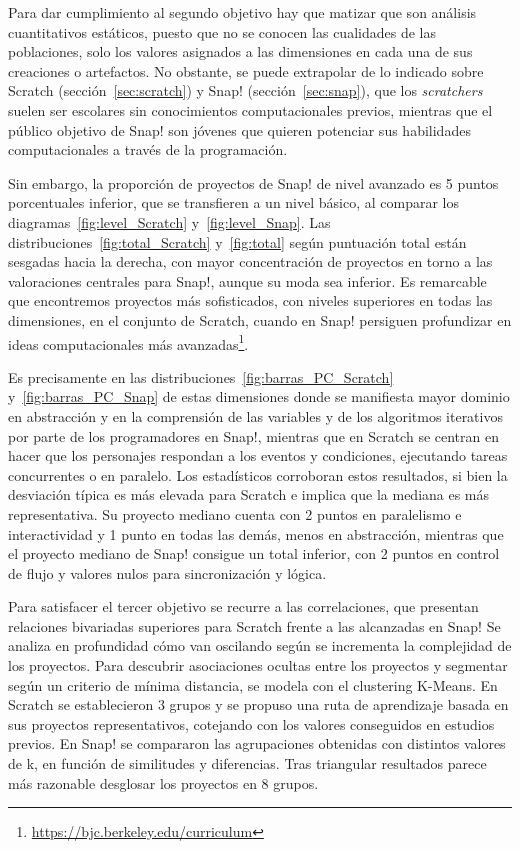 \documentclass[a4paper, 12pt]{book}
\begin{document}
Para dar cumplimiento al segundo objetivo hay que matizar que son análisis cuantitativos estáticos, puesto que no se conocen las cualidades de las poblaciones, solo los valores asignados a las dimensiones en cada una de sus creaciones o artefactos. No obstante, se puede extrapolar de lo indicado sobre Scratch (sección~\ref{sec:scratch}) y Snap! (sección~\ref{sec:snap}), que los \emph{scratchers} suelen ser escolares sin conocimientos computacionales previos, mientras que el público objetivo de Snap! son jóvenes que quieren potenciar sus habilidades computacionales a través de la programación.

Sin embargo, la proporción de proyectos de Snap! de nivel avanzado es 5 puntos porcentuales inferior, que se transfieren a un nivel básico, al comparar los diagramas~\ref{fig:level_Scratch} y~\ref{fig:level_Snap}. Las distribuciones~\ref{fig:total_Scratch} y~\ref{fig:total} según puntuación total están sesgadas hacia la derecha, con mayor concentración de proyectos en torno a las valoraciones centrales para Snap!, aunque su moda sea inferior. Es remarcable que encontremos proyectos más sofisticados, con niveles superiores en todas las dimensiones, en el conjunto de Scratch, cuando en Snap! persiguen profundizar en ideas computacionales más avanzadas\footnote{\url{https://bjc.berkeley.edu/curriculum}}.

Es precisamente en las distribuciones~\ref{fig:barras_PC_Scratch} y~\ref{fig:barras_PC_Snap} de estas dimensiones donde se manifiesta mayor dominio en abstracción y en la comprensión de las variables y de los algoritmos iterativos por parte de los programadores en Snap!, mientras que en Scratch se centran en hacer que los personajes respondan a los eventos y condiciones, ejecutando tareas concurrentes o en paralelo. Los estadísticos corroboran estos resultados, si bien la desviación típica es más elevada para Scratch e implica que la mediana es más representativa. Su proyecto mediano cuenta con 2 puntos en paralelismo e interactividad y 1 punto en todas las demás, menos en abstracción, mientras que el proyecto mediano de Snap! consigue un total inferior, con 2 puntos en control de flujo y valores nulos para sincronización y lógica.

Para satisfacer el tercer objetivo se recurre a las correlaciones, que presentan relaciones bivariadas superiores para Scratch frente a las alcanzadas en Snap! Se analiza en profundidad cómo van oscilando según se incrementa la complejidad de los proyectos. Para descubrir asociaciones ocultas entre los proyectos y segmentar según un criterio de mínima distancia, se modela con el clustering K-Means. En Scratch se establecieron 3 grupos y se propuso una ruta de aprendizaje basada en sus proyectos representativos, cotejando con los valores conseguidos en estudios previos. En Snap! se compararon las agrupaciones obtenidas con distintos valores de k, en función de similitudes y diferencias. Tras triangular resultados parece más razonable desglosar los proyectos en 8 grupos. 
\end{document}
